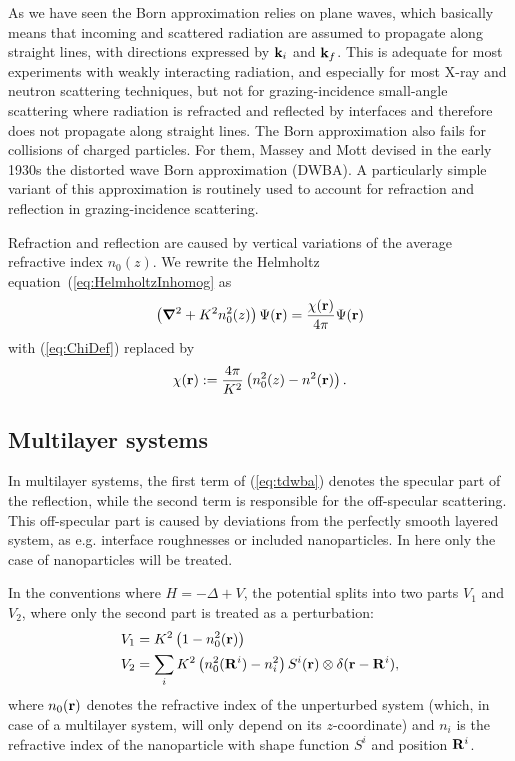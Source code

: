 As we have seen
the Born approximation relies on plane waves,
which basically means that incoming and scattered radiation
are assumed to propagate along straight lines,
with directions expressed by $\mathbf{k}_i$ and $\mathbf{k}_f$.
This is adequate for most experiments with weakly interacting radiation,
and especially for most X-ray and neutron scattering techniques,
but not for grazing-incidence small-angle scattering
where radiation is refracted and reflected by interfaces
and therefore does not propagate along straight lines.
The Born approximation also fails for collisions of charged particles.
For them, Massey and Mott devised in the early 1930s
the distorted wave Born approximation (DWBA).
A particularly simple variant of this approximation
is routinely used to account for refraction and reflection
in grazing-incidence scattering.

Refraction and reflection are caused by vertical variations
of the average refractive index $n_0(z)$.
We rewrite the Helmholtz equation~(\ref{eq:HelmholtzInhomog} as
\begin{equation}\label{eq:HelmholtzGraded}
  \left(\bm{\nabla}^2+K^2n_0^2(z)\right)\Psi(\mathbf{r})
  = \frac{\chi(\mathbf{r})}{4\pi}\Psi(\mathbf{r})
\end{equation}
with (\ref{eq:ChiDef}) replaced by
\begin{equation}\label{eq:ChiGraded}
  \chi(\mathbf{r}) := \frac{4\pi}{K^2}\left(n_0^2(z)-n^2(\mathbf{r})\right).
\end{equation}

\subsection{Multilayer systems}

In multilayer systems, the first term of (\ref{eq:tdwba}) denotes the specular part of the reflection, while the second term is responsible for the off-specular scattering. This off-specular part is caused by deviations from the perfectly smooth layered system, as e.g. interface roughnesses or included nanoparticles. In here only the case of nanoparticles will be treated.

In the conventions where $H=-\Delta + V$, the potential splits into two parts $V_1$ and $V_2$, where only the second part is treated as a perturbation:
\begin{align*}
  V_1 & = K^2\left( 1-n_0^2(\mathbf{r})\right)  \\
  V_2 & = \sum_i K^2\left( n_0^2(\mathbf{R}^i) - n_i^2 \right) S^i(\mathbf{r}) \otimes \delta(\mathbf{r}-\mathbf{R}^i),
\end{align*}
where $n_0(\mathbf{r})$ denotes the refractive index of the unperturbed system (which, in case of a multilayer system, will only depend on its $z$-coordinate) and $n_i$ is the refractive index of the nanoparticle with shape function $S^i$ and position $\mathbf{R}^i$.


